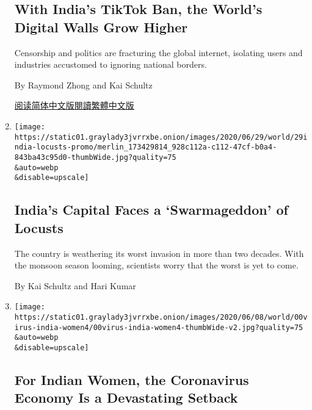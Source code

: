 \begin{enumerate}
{  \subsection{With India's TikTok Ban, the World's Digital Walls Grow
  Higher}\label{with-indias-tiktok-ban-the-worlds-digital-walls-grow-higher}}

  Censorship and politics are fracturing the global internet, isolating
  users and industries accustomed to ignoring national borders.

  By Raymond Zhong and Kai Schultz

  \href{https://cn.nytimes3xbfgragh.onion/technology/20200701/india-china-tiktok/}{阅读简体中文版}\href{https://cn.nytimes3xbfgragh.onion/technology/20200701/india-china-tiktok/zh-hant/}{閱讀繁體中文版}
\item
  \href{/2020/06/29/world/asia/india-new-delhi-locusts.html}{}

  \texttt{[image: https://static01.graylady3jvrrxbe.onion/images/2020/06/29/world/29india-locusts-promo/merlin\_173429814\_928c112a-c112-47cf-b0a4-843ba43c95d0-thumbWide.jpg?quality=75\\\&auto=webp\\\&disable=upscale]}

  \hypertarget{indias-capital-faces-a-swarmageddon-of-locusts}{%
  \subsection{India's Capital Faces a `Swarmageddon' of
  Locusts}\label{indias-capital-faces-a-swarmageddon-of-locusts}}

  The country is weathering its worst invasion in more than two decades.
  With the monsoon season looming, scientists worry that the worst is
  yet to come.

  By Kai Schultz and Hari Kumar
\item
  \href{/2020/06/09/world/asia/india-coronavirus-women-economy.html}{}

  \texttt{[image: https://static01.graylady3jvrrxbe.onion/images/2020/06/08/world/00virus-india-women4/00virus-india-women4-thumbWide-v2.jpg?quality=75\\\&auto=webp\\\&disable=upscale]}

  \hypertarget{for-indian-women-the-coronavirus-economy-is-a-devastating-setback}{%
  \subsection{For Indian Women, the Coronavirus Economy Is a Devastating
  Setback}\label{for-indian-women-the-coronavirus-economy-is-a-devastating-setback}}


\end{enumerate}
